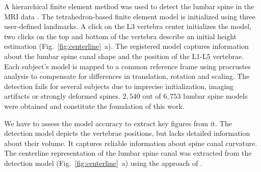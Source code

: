 \documentclass[a4paper,twoside]{style/article}
\newcommand{\com}[1]{\textcolor{orange}{\uline{#1}}}
\begin{document}
A hierarchical finite element method was used to detect the lumbar spine in the MRI data \cite{Rak2013}.
The tetrahedron-based finite element model is initialized using three user-defined landmarks.
A click on the L3 vertebra center initializes the model, two clicks on the top and bottom of the vertebra describe an initial height estimation (Fig.~\ref{fig:centerline}~a).
The registered model captures information about the lumbar spine canal shape and the position of the L1-L5 vertebrae.
Each subject's model is mapped to a common reference frame using procrustes analysis to compensate for differences in translation, 
rotation and scaling.
The detection fails for several subjects due to imprecise initialization, imaging artifacts or strongly deformed spines.
$2,540$ out of $6,753$ lumbar spine models were obtained and constitute the foundation of this work.

We have to assess the model accuracy to extract key figures from it.
The detection model depicts the vertebrae positions, but lacks detailed information about their volume.
It captures reliable information about spine canal curvature.
The centerline representation of the lumbar spine canal was extracted from the detection model (Fig.~\ref{fig:centerline}~a) using the approach of \cite{Klemm2013VMV}.
\end{document}
